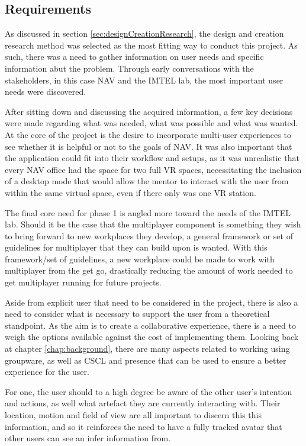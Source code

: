 \subsection{Requirements}
\label{section:phase1Requirements}
As discussed in section \ref{sec:designCreationResearch}, the design and creation research method was selected as the most fitting way to conduct this project. As such, there was a need to gather information on user needs and specific information abut the problem. Through early conversations with the stakeholders, in this case NAV and the IMTEL lab, the most important user needs were discovered. 

After sitting down and discussing the acquired information, a few key decisions were made regarding what was needed, what was possible and what was wanted.  At the core of the project is the desire to incorporate multi-user experiences to see whether it is helpful or not to the goals of NAV. It was also important that the application could fit into their workflow and setups, as it was unrealistic that every NAV office had the space for two full VR spaces, necessitating the inclusion of a desktop mode that would allow the mentor to interact with the user from within the same virtual space, even if there only was one VR station. 

The final core need for phase 1 is angled more toward the needs of the IMTEL lab. Should it be the case that the multiplayer component is something they wish to bring forward to new workplaces they develop, a general framework or set of guidelines for multiplayer that they can build upon is wanted. With this framework/set of guidelines, a new workplace could be made to work with multiplayer from the get go, drastically reducing the amount of work needed to get multiplayer running for future projects.

Aside from explicit user that need to be considered in the project, there is also a need to consider what is necessary to support the user from a theoretical standpoint. As the aim is to create a collaborative experience, there is a need to weigh the options available against the cost of implementing them. Looking back at chapter \ref{chap:background}, there are many aspects related to working using groupware, as well as CSCL and presence that can be used to ensure a better experience for the user.

For one, the user should to a high degree be aware of the other user's intention and actions, as well what artefact they are currently interacting with. Their location, motion and field of view are all important to discern this this information, and so it reinforces the need to have a fully tracked avatar that other users can see an infer information from.

